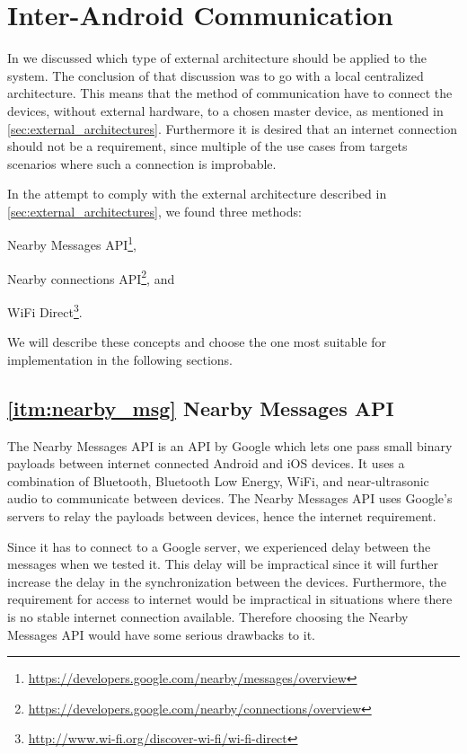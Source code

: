 \section{Inter-Android Communication}\label{sec:communication_methods}
In  we discussed which type of external architecture should be applied to the system.
The conclusion of that discussion was to go with a local centralized architecture.
This means that the method of communication have to connect the devices, without external hardware, to a chosen master device, as mentioned in \cref{sec:external_architectures}.
Furthermore it is desired that an internet connection should not be a requirement, since multiple of the use cases from  targets scenarios where such a connection is improbable.

In the attempt to comply with the external architecture described in \cref{sec:external_architectures}, we found three methods:
\begin{enumberate*}
\item Nearby Messages API\footnote{\url{https://developers.google.com/nearby/messages/overview}},\label{itm:nearby_msg}
\item Nearby connections API\footnote{\url{https://developers.google.com/nearby/connections/overview}}, and\label{itm:nearby_conn}
\item WiFi Direct\footnote{\url{http://www.wi-fi.org/discover-wi-fi/wi-fi-direct}}.\label{itm:wifi_direct}
\end{enumberate*}
We will describe these concepts and choose the one most suitable for implementation in the following sections.

\subsection*{\ref{itm:nearby_msg} Nearby Messages API}
The Nearby Messages API is an API by Google which lets one pass small binary payloads between internet connected Android and iOS devices.
It uses a combination of Bluetooth, Bluetooth Low Energy, WiFi, and near-ultrasonic audio to communicate between devices.
The Nearby Messages API uses Google's servers to relay the payloads between devices, hence the internet requirement.\cite{nearby_messages}

Since it has to connect to a Google server, we experienced delay between the messages when we tested it.
This delay will be impractical since it will further increase the delay in the synchronization between the devices.
Furthermore, the requirement for access to internet would be impractical in situations where there is no stable internet connection available.
Therefore choosing the Nearby Messages API would have some serious drawbacks to it.


